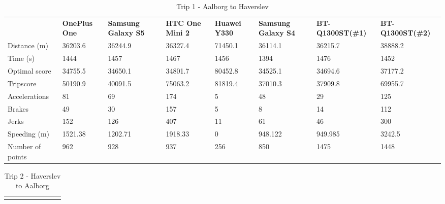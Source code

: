 \begin{landscape}
\begin{table*}[h]
\hspace{-2.5in}
\begin{minipage}{0.95\textwidth}
\caption{Trip 1 - Aalborg to Haverslev}
\label{exp1trip1}
\begin{tabular}{|l|lllllll|}
\hline
\rowcolor{tablegreen}

                 & \textbf{OnePlus One} & \textbf{Samsung Galaxy S5} & \textbf{HTC One Mini 2} & \textbf{Huawei Y330} & \textbf{Samsung Galaxy S4} & \textbf{BT-Q1300ST(\#1)} & \textbf{BT-Q1300ST(\#2)} \\
Distance (m)     & 36203.6     & 36244.9           & 36327.4        & 71450.1     & 36114.1           & 36215.7         & 38888.2         \\
Time (s)         & 1444        & 1457              & 1467           & 1456        & 1394              & 1476            & 1452            \\
Optimal score    & 34755.5     & 34650.1           & 34801.7        & 80452.8     & 34525.1           & 34694.6         & 37177.2         \\
Tripscore        & 50190.9     & 40091.5           & 75063.2        & 81819.4     & 37010.3           & 37909.8         & 69955.7         \\
Accelerations    & 81          & 69                & 174            & 5           & 48                & 29              & 125             \\
Brakes           & 49          & 30                & 157            & 5           & 8                 & 14              & 112             \\
Jerks            & 152         & 126               & 407            & 11          & 61                & 46              & 300             \\
Speeding (m)     & 1521.38     & 1202.71           & 1918.33        & 0           & 948.122           & 949.985         & 3242.5          \\
Number of points & 962         & 928               & 937            & 256         & 850               & 1475            & 1448      \\\hline 
\end{tabular}
\end{minipage}
\end{table*}
\vspace{10 mm}
\begin{table*}[h]
\hspace{-2.5in}
\begin{minipage}{0.95\textwidth}
\caption{Trip 2 - Haverslev to Aalborg}
\label{exp1trip2}
\begin{tabular}{|l|lllllll|}
\hline
\rowcolor{tablegreen}


\end{tabular}
\end{minipage}
\end{table*}
\end{landscape}
